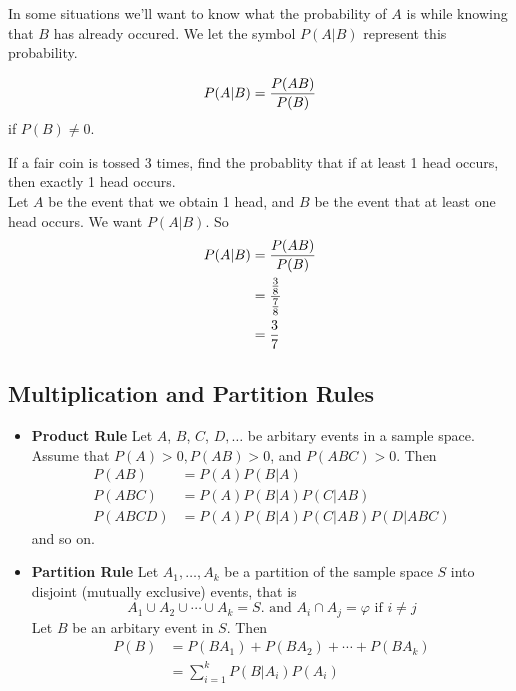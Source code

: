 \documentclass[english, 11pt]{article}
\begin{document}
  In some situations we'll want to know what the probability of $A$ is while knowing that $B$ has already occured. We let the symbol $P(A|B)$ represent this probability.

  \begin{defn}\label{conditional probability}
    \[ P(A|B) = \frac{P(AB)}{P(B)} \]
    if $P(B) \not = 0$.
  \end{defn}

  \begin{exmp}
  If a fair coin is tossed 3 times, find the probablity that if at least 1 head occurs, then exactly 1 head occurs.\\

  Let $A$ be the event that we obtain 1 head, and $B$ be the event that at least one head occurs. We want $P(A|B)$. So
  \begin{align*}
    P(A|B) & = \frac{P(AB)}{P(B)} \\
    & = \frac{\frac{3}{8}}{\frac{7}{8}} \\
    & = \frac{3}{7}
  \end{align*}
  \end{exmp}

  \subsection{Multiplication and Partition Rules}

  \begin{itemize}
    \item \textbf{Product Rule} Let $A$, $B$, $C$, $D, \ldots$ be arbitary events in a sample space. Assume that $P(A) > 0, P(AB)>0$, and $P(ABC) > 0$. Then
    \begin{align*}
      P(AB) & = P(A)P(B|A) \\
      P(ABC) & = P(A)P(B|A)P(C|AB) \\
      P(ABCD) & = P(A)P(B|A)P(C|AB)P(D|ABC)
    \end{align*}
    and so on.
    \item \textbf{Partition Rule} Let $A_1,\ldots, A_k$ be a partition of the sample space $S$ into disjoint (mutually exclusive) events, that is
    \[ A_1 \cup A_2 \cup \cdots \cup A_k = S. \mbox{ \ and \ } A_i \cap A_j = \varphi \mbox{\ if $i \not = j$} \]
    Let $B$ be an arbitary event in $S$. Then
    \begin{align*}
      P(B) & = P(BA_1) + P(BA_2) + \cdots + P(BA_k) \\
      & = \sum_{i = 1}^k P(B|A_i)P(A_i)
    \end{align*}
  \end{itemize}
\end{document}
